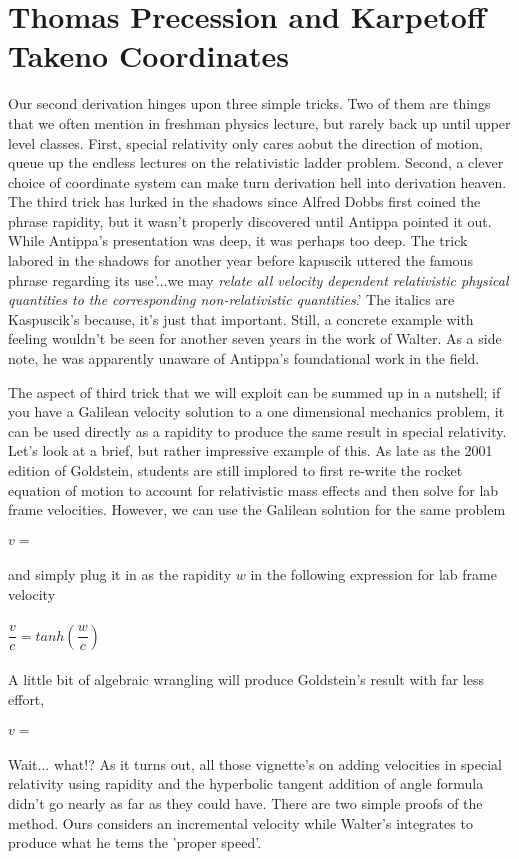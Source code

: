 \documentclass[prb,preprint]{revtex4-1}
\begin{document}
\section{Thomas Precession and Karpetoff Takeno Coordinates}
Our second derivation hinges upon three simple tricks. Two of them are things that we often mention in freshman physics lecture, but rarely back up until upper level classes.  First, special relativity only cares aobut the direction of motion, queue up the endless lectures on the relativistic ladder problem.  Second, a clever choice of coordinate system can make turn derivation hell into derivation heaven.  The third trick has lurked in the shadows since Alfred Dobbs first coined the phrase rapidity, but it wasn't properly discovered until Antippa \cite{antipparapid} pointed it out.  While Antippa's presentation was deep, it was perhaps too deep.  The trick labored in the shadows for another year before kapuscik\cite{kapuscikrapid} uttered the famous phrase regarding its use'...we may \textit{relate all velocity dependent relativistic physical quantities to the corresponding non-relativistic quantities}.'  The italics are Kaspuscik's because, it's just that important.  Still, a concrete example with feeling wouldn't be seen for another seven years in the work of Walter\cite{wlaterrapid}.  As a side note, he was apparently unaware of Antippa's foundational work in the field.

The aspect of third trick that we will exploit can be summed up in a nutshell; if you have a Galilean velocity solution to a one dimensional mechanics problem, it can be used directly as a rapidity to produce the same result in special relativity.  Let's look at a brief, but rather impressive example of this.  As late as the 2001 edition of Goldstein, students are still implored to first re-write the rocket equation of motion to account for relativistic mass effects and then solve for lab frame velocities.  However, we can use the Galilean solution for the same problem
\\
\\
$v = $
\\
\\
and simply plug it in as the rapidity $w$ in the following expression for lab frame velocity
\\
\\
$\dfrac{v}{c} = tanh\left(\dfrac{w}{c}\right)$
\\
\\
A little bit of algebraic wrangling will produce Goldstein's result with far less effort,
\\
\\
$v = $
\\
\\
Wait... what!?  As it turns out, all those vignette's on adding velocities in special relativity using rapidity and the hyperbolic tangent addition of angle formula didn't go nearly as far as they could have.  There are two simple proofs of the method.  Ours considers an incremental velocity while Walter's integrates to produce what he tems the 'proper speed'.
\end{document}
